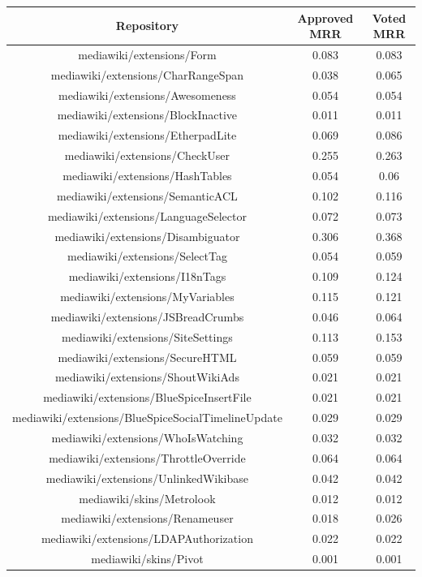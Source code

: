 \begin{center}
\begin{tabular}{@{}c c c@{}} 
 \hline
    \textbf{Repository} & {Approved MRR} & {Voted MRR} \\
\hline
mediawiki/extensions/Form & 0.083 & 0.083 \\
mediawiki/extensions/CharRangeSpan & 0.038 & 0.065 \\
mediawiki/extensions/Awesomeness & 0.054 & 0.054 \\
mediawiki/extensions/BlockInactive & 0.011 & 0.011 \\
mediawiki/extensions/EtherpadLite & 0.069 & 0.086 \\
mediawiki/extensions/CheckUser & 0.255 & 0.263 \\
mediawiki/extensions/HashTables & 0.054 & 0.06 \\
mediawiki/extensions/SemanticACL & 0.102 & 0.116 \\
mediawiki/extensions/LanguageSelector & 0.072 & 0.073 \\
mediawiki/extensions/Disambiguator & 0.306 & 0.368 \\
mediawiki/extensions/SelectTag & 0.054 & 0.059 \\
mediawiki/extensions/I18nTags & 0.109 & 0.124 \\
mediawiki/extensions/MyVariables & 0.115 & 0.121 \\
mediawiki/extensions/JSBreadCrumbs & 0.046 & 0.064 \\
mediawiki/extensions/SiteSettings & 0.113 & 0.153 \\
mediawiki/extensions/SecureHTML & 0.059 & 0.059 \\
mediawiki/extensions/ShoutWikiAds & 0.021 & 0.021 \\
mediawiki/extensions/BlueSpiceInsertFile & 0.021 & 0.021 \\
mediawiki/extensions/BlueSpiceSocialTimelineUpdate & 0.029 & 0.029 \\
mediawiki/extensions/WhoIsWatching & 0.032 & 0.032 \\
mediawiki/extensions/ThrottleOverride & 0.064 & 0.064 \\
mediawiki/extensions/UnlinkedWikibase & 0.042 & 0.042 \\
mediawiki/skins/Metrolook & 0.012 & 0.012 \\
mediawiki/extensions/Renameuser & 0.018 & 0.026 \\
mediawiki/extensions/LDAPAuthorization & 0.022 & 0.022 \\
mediawiki/skins/Pivot & 0.001 & 0.001 \\

\end{tabular}
\end{center}
